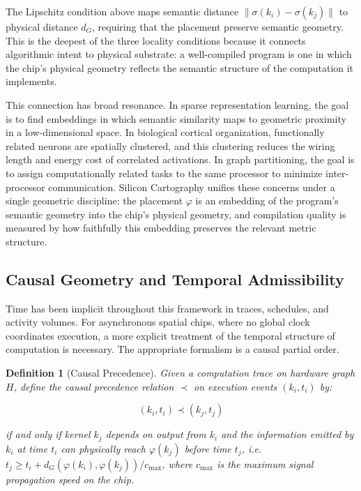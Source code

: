 \documentclass[11pt, a4paper]{article}
\newtheorem{definition}{Definition}
\begin{document}
The Lipschitz condition above maps semantic distance $\|\sigma(k_i) - \sigma(k_j)\|$
to physical distance $d_G$, requiring that the placement preserve semantic geometry.
This is the deepest of the three locality conditions because it connects algorithmic
intent to physical substrate: a well-compiled program is one in which the chip's
physical geometry reflects the semantic structure of the computation it implements.

This connection has broad resonance. In sparse representation learning, the goal is
to find embeddings in which semantic similarity maps to geometric proximity in a
low-dimensional space. In biological cortical organization, functionally related
neurons are spatially clustered, and this clustering reduces the wiring length and
energy cost of correlated activations. In graph partitioning, the goal is to assign
computationally related tasks to the same processor to minimize inter-processor
communication. Silicon Cartography unifies these concerns under a single geometric
discipline: the placement $\varphi$ is an embedding of the program's semantic
geometry into the chip's physical geometry, and compilation quality is measured
by how faithfully this embedding preserves the relevant metric structure.

\subsection{Causal Geometry and Temporal Admissibility}

Time has been implicit throughout this framework in traces, schedules, and activity
volumes. For asynchronous spatial chips, where no global clock coordinates execution,
a more explicit treatment of the temporal structure of computation is necessary. The
appropriate formalism is a causal partial order.

\begin{definition}[Causal Precedence]
Given a computation trace on hardware graph $H$, define the \emph{causal precedence}
relation $\prec$ on execution events $(k_i, t_i)$ by:

\[
(k_i, t_i) \prec (k_j, t_j)
\]

if and only if kernel $k_j$ depends on output from $k_i$ and the information
emitted by $k_i$ at time $t_i$ can physically reach $\varphi(k_j)$ before
time $t_j$, i.e.\ $t_j \geq t_i + d_G(\varphi(k_i), \varphi(k_j)) / c_{\max}$,
where $c_{\max}$ is the maximum signal propagation speed on the chip.
\end{definition}
\end{document}
